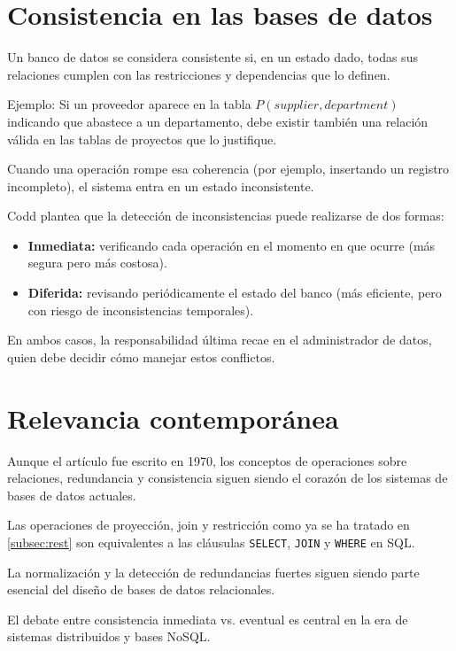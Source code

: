 \documentclass{article}
\begin{document}
\section{Consistencia en las bases de datos}

Un banco de datos se considera consistente si, en un estado dado, todas sus relaciones cumplen con las restricciones y dependencias que lo definen.

Ejemplo:  
Si un proveedor aparece en la tabla $P(supplier, department)$ indicando que abastece a un departamento, debe existir también una relación válida en las tablas de proyectos que lo justifique.

Cuando una operación rompe esa coherencia (por ejemplo, insertando un registro incompleto), el sistema entra en un estado inconsistente.

Codd plantea que la detección de inconsistencias puede realizarse de dos formas:

\begin{itemize}
    \item \textbf{Inmediata:} verificando cada operación en el momento en que ocurre (más segura pero más costosa).
    \item \textbf{Diferida:} revisando periódicamente el estado del banco (más eficiente, pero con riesgo de inconsistencias temporales).
\end{itemize}

En ambos casos, la responsabilidad última recae en el administrador de datos, quien debe decidir cómo manejar estos conflictos.

\section{Relevancia contemporánea}

Aunque el artículo fue escrito en 1970, los conceptos de operaciones sobre relaciones, redundancia y consistencia siguen siendo el corazón de los sistemas de bases de datos actuales.

Las operaciones de proyección, join y restricción como ya se ha tratado en \autoref{subsec:rest} son equivalentes a las cláusulas \texttt{SELECT}, \texttt{JOIN} y \texttt{WHERE} en SQL.

La normalización y la detección de redundancias fuertes siguen siendo parte esencial del diseño de bases de datos relacionales.

El debate entre consistencia inmediata vs. eventual es central en la era de sistemas distribuidos y bases NoSQL.
\end{document}
